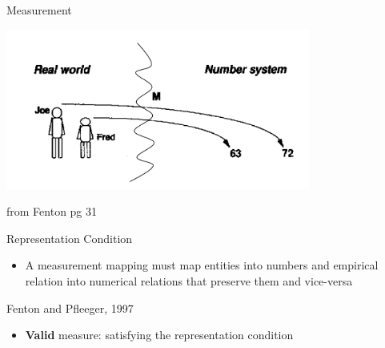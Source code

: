 \documentclass{beamer}
\begin{document}
\begin{frame}{\centerline{Measurement}}

\begin{center}
\includegraphics[width=100mm]{A2022.IDSEPC.SperimentazioneDeduzione/img-img09.png}
\newline
\end{center}

\begin{small}
\begin{center}
from Fenton pg 31
\end{center}
\end{small}

\end{frame}

\begin{frame}{\centerline{Representation Condition}}


\begin{itemize}
\item  A measurement mapping must map entities into numbers and empirical relation into numerical relations that preserve them and vice-versa
\end{itemize}
\begin{flushright}
Fenton and Pfleeger, 1997
\end{flushright}
\begin{itemize}
\item  \textbf{Valid} measure: satisfying the representation condition
\end{itemize}

\end{frame}
\end{document}

